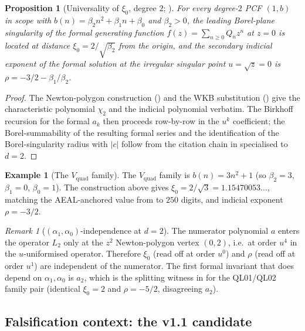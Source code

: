 \documentclass[11pt,reqno]{amsart}
\theoremstyle{plain}
\newtheorem{proposition}[theorem]{Proposition}
\theoremstyle{definition}
\newtheorem{example}[theorem]{Example}
\theoremstyle{remark}
\newtheorem{remark}[theorem]{Remark}
\begin{document}
\begin{proposition}[Universality of $\xi_0$, degree $2$;
{\cite[Prop.~3.3.A]{siarc_channel_theory_v13}}]
\label{prop:xi0-d2}
For every degree-$2$ PCF $(1, b)$ in scope with
$b(n) = \beta_2 n^2 + \beta_1 n + \beta_0$ and
$\beta_2 > 0$, the leading Borel-plane singularity of the
formal generating function $f(z) = \sum_{n \ge 0} Q_n z^n$
at $z = 0$ is located at distance
$\xi_0 = 2/\sqrt{\beta_2}$
from the origin, and the secondary indicial exponent of the
formal solution at the irregular singular point
$u = \sqrt{z} = 0$ is $\rho = -3/2 - \beta_1/\beta_2$.
\end{proposition}

\begin{proof}
The Newton-polygon construction () and
the WKB substitution () give the
characteristic polynomial $\chi_2$ and the indicial
polynomial verbatim. The Birkhoff recursion for the formal
$a_k$ then proceeds row-by-row in the $u^k$ coefficient; the
Borel-summability of the resulting formal series and the
identification of the Borel-singularity radius with $|c|$
follow from the citation chain in 
specialised to $d=2$.
\end{proof}

\begin{example}[The $V_{\mathrm{quad}}$ family]
\label{ex:Vquad}
The $V_{\mathrm{quad}}$ family is $b(n) = 3 n^2 + 1$
(so $\beta_2 = 3$, $\beta_1 = 0$, $\beta_0 = 1$). The
construction above gives
$\xi_0 = 2/\sqrt{3} = 1.15470053\ldots$,
matching the AEAL-anchored value from
\cite{siarc_pcf1_v13} to $250$ digits, and indicial
exponent $\rho = -3/2$.
\end{example}

\begin{remark}[$(\alpha_1, \alpha_0)$-independence at $d = 2$]
\label{rem:numerator-indep}
The numerator polynomial $a$ enters the operator $L_2$ only
at the $z^2$ Newton-polygon vertex $(0,2)$, i.e.\ at order
$u^4$ in the $u$-uniformised operator. Therefore $\xi_0$
(read off at order $u^0$) and $\rho$ (read off at order
$u^1$) are independent of the numerator. The first formal
invariant that does depend on $\alpha_1, \alpha_0$ is $a_2$,
which is the splitting witness in
\cite[Prop.~3.3.B]{siarc_channel_theory_v13} for the
QL01/QL02 family pair (identical $\xi_0 = 2$ and
$\rho = -5/2$, disagreeing $a_2$).
\end{remark}

\subsection{Falsification context: the v1.1 candidate}
\label{ssec:falsification}
\end{document}
